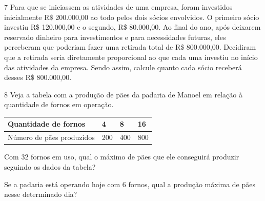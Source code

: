 \num{7} Para que se iniciassem as atividades de uma empresa, foram investidos
inicialmente R\$ 200.000,00 ao todo pelos dois sócios envolvidos. O primeiro
sócio investiu R\$ 120.000,00 e o segundo, R\$ 80.000,00. Ao final do ano,
após deixarem reservado dinheiro para investimentos e para necessidades
futuras, eles perceberam que poderiam fazer uma retirada total de R\$ 800.000,00. Decidiram que a retirada seria diretamente proporcional ao que
cada uma investiu no início das atividades da empresa. Sendo assim,
calcule quanto cada sócio receberá desses R\$ 800.000,00.



\num{8} Veja a tabela com a produção de pães da padaria de Manoel em relação à quantidade de fornos em operação.

\begin{tabular}{l|l|l|l}
\hline
Quantidade de fornos & 4 & 8 & 16 \\ \hline
Número de pães produzidos & 200 & 400 & 800 \\ \hline
\end{tabular}

\begin{escolha}
\item
  Com 32 fornos em uso, qual o máximo de pães que ele conseguirá
  produzir seguindo os dados da tabela?


\item
  Se a padaria está operando hoje com 6 fornos, qual a produção máxima
  de pães nesse determinado dia?

\end{escolha}

